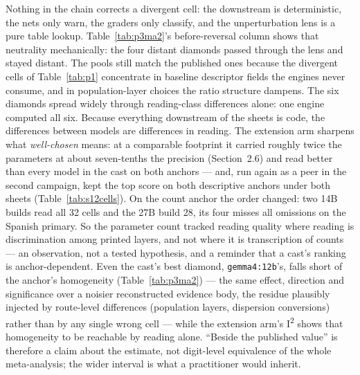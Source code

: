 \documentclass[11pt]{article}
\begin{document}
Nothing in the chain corrects a divergent cell: the downstream is deterministic, the nets only warn, the graders only classify, and the unperturbation lens is a pure table lookup. Table~\ref{tab:p3ma2}'s before-reversal column shows that neutrality mechanically: the four distant diamonds passed through the lens and stayed distant. The pools still match the published ones because the divergent cells of Table~\ref{tab:p1} concentrate in baseline descriptor fields the engines never consume, and in population-layer choices the ratio structure dampens. The six diamonds spread widely through reading-class differences alone: one engine computed all six. Because everything downstream of the sheets is code, the differences between models are differences in reading. The extension arm sharpens what \emph{well-chosen} means: at a comparable footprint it carried roughly twice the parameters at about seven-tenths the precision (Section~2.6) and read better than every model in the cast on both anchors --- and, run again as a peer in the second campaign, kept the top score on both descriptive anchors under both sheets (Table~\ref{tab:s12cells}). On the count anchor the order changed: two 14B builds read all 32 cells and the 27B build 28, its four misses all omissions on the Spanish primary. So the parameter count tracked reading quality where reading is discrimination among printed layers, and not where it is transcription of counts --- an observation, not a tested hypothesis, and a reminder that a cast's ranking is anchor-dependent. Even the cast's best diamond, \texttt{gemma4:12b}'s, falls short of the anchor's homogeneity (Table~\ref{tab:p3ma2}) --- the same effect, direction and significance over a noisier reconstructed evidence body, the residue plausibly injected by route-level differences (population layers, dispersion conversions) rather than by any single wrong cell --- while the extension arm's I\textsuperscript{2} shows that homogeneity to be reachable by reading alone. ``Beside the published value'' is therefore a claim about the estimate, not digit-level equivalence of the whole meta-analysis; the wider interval is what a practitioner would inherit.
\end{document}
